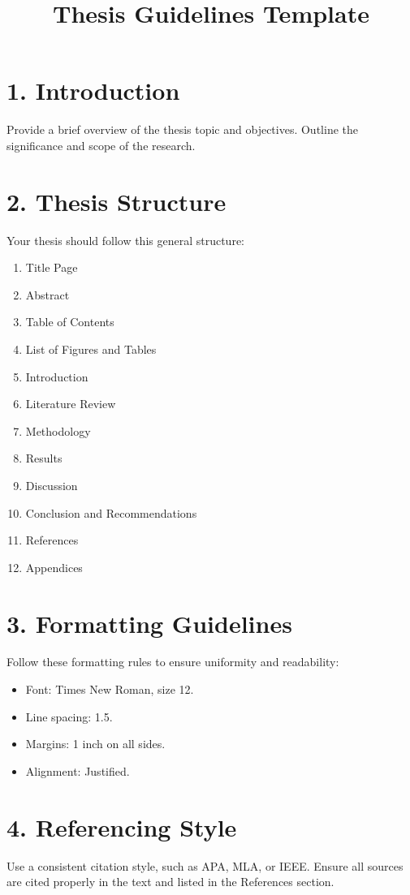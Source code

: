 \documentclass[12pt,a4paper]{article}
\title{Thesis Guidelines Template}
\author{}
\date{}
\begin{document}
\maketitle

\section*{1. Introduction}
Provide a brief overview of the thesis topic and objectives. Outline the significance and scope of the research.

\section*{2. Thesis Structure}
Your thesis should follow this general structure:
\begin{enumerate}
    \item Title Page
    \item Abstract
    \item Table of Contents
    \item List of Figures and Tables
    \item Introduction
    \item Literature Review
    \item Methodology
    \item Results
    \item Discussion
    \item Conclusion and Recommendations
    \item References
    \item Appendices
\end{enumerate}

\section*{3. Formatting Guidelines}
Follow these formatting rules to ensure uniformity and readability:
\begin{itemize}
    \item Font: Times New Roman, size 12.
    \item Line spacing: 1.5.
    \item Margins: 1 inch on all sides.
    \item Alignment: Justified.
\end{itemize}

\section*{4. Referencing Style}
Use a consistent citation style, such as APA, MLA, or IEEE. Ensure all sources are cited properly in the text and listed in the References section.
\end{document}
